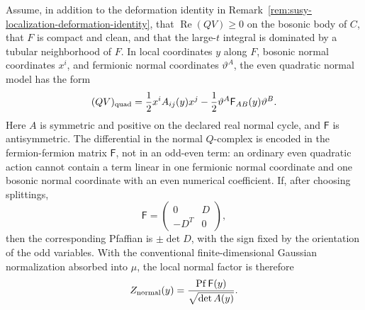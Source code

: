 Assume, in addition to the deformation identity in
Remark~\ref{rem:susy-localization-deformation-identity}, that
\(\operatorname{Re}(QV)\ge0\) on the bosonic body of \(C\), that \(F\) is
compact and clean, and that the large-\(t\) integral is dominated by a
tubular neighborhood of \(F\).  In local coordinates \(y\) along \(F\),
bosonic normal coordinates \(x^i\), and fermionic normal coordinates
\(\vartheta^A\), the even quadratic normal model has the form
\begin{equation}
  (QV)_{\rm quad}
  =
  \frac12 x^i A_{ij}(y)x^j
  -
  \frac12\vartheta^A\mathsf F_{AB}(y)\vartheta^B .
  \label{eq:finite-normal-quadratic-model}
\end{equation}
Here \(A\) is symmetric and positive on the declared real normal cycle, and
\(\mathsf F\) is antisymmetric.  The differential in the normal
\(Q\)-complex is encoded in the fermion-fermion matrix \(\mathsf F\), not in
an odd-even term: an ordinary even quadratic action cannot contain a term
linear in one fermionic normal coordinate and one bosonic normal coordinate
with an even numerical coefficient.  If, after choosing splittings,
\begin{equation}
  \mathsf F=
  \begin{pmatrix}
    0&D\\
    -D^T&0
  \end{pmatrix},
  \label{eq:normal-complex-fermion-block}
\end{equation}
then the corresponding Pfaffian is \(\pm\det D\), with the sign fixed by the
orientation of the odd variables.  With the conventional
finite-dimensional Gaussian normalization absorbed into \(\mu\), the local
normal factor is therefore
\begin{equation}
  Z_{\rm normal}(y)
  =
  \frac{\operatorname{Pf}\mathsf F(y)}
       {\sqrt{\det A(y)}} .
  \label{eq:finite-normal-localization-factor}
\end{equation}

